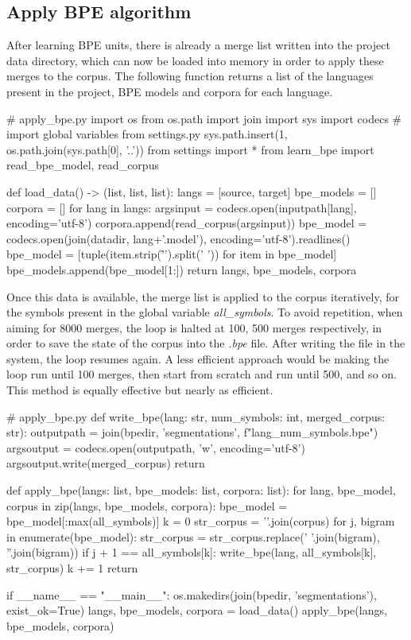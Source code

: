 \subsection{Apply BPE algorithm}\label{dev:applybpe}

After learning BPE units, there is already a merge list written into the project data directory, which can now be loaded into memory in order to apply these merges to the corpus. The following function returns a list of the languages present in the project, BPE models and corpora for each language.

\begin{python}
# apply_bpe.py
import os
from os.path import join
import sys
import codecs
# import global variables from settings.py
sys.path.insert(1, os.path.join(sys.path[0], '..'))
from settings import *
from learn_bpe import read_bpe_model, read_corpus

def load_data() -> (list, list, list):
  langs = [source, target]
  bpe_models = []
  corpora = []
  for lang in langs:
    argsinput = codecs.open(inputpath[lang], encoding='utf-8')
    corpora.append(read_corpus(argsinput))
    bpe_model = codecs.open(join(datadir, lang+'.model'), encoding='utf-8').readlines()
    bpe_model = [tuple(item.strip('\r\n ').split(' ')) for item in bpe_model]
    bpe_models.append(bpe_model[1:])
  return langs, bpe_models, corpora
\end{python}

Once this data is available, the merge list is applied to the corpus iteratively, for the symbols present in the global variable \emph{all\_symbols}. To avoid repetition, when aiming for 8000 merges, the loop is halted at 100, 500 merges respectively, in order to save the state of the corpus into the \emph{.bpe} file. After writing the file in the system, the loop resumes again. A less efficient approach would be making the loop run until 100 merges, then start from scratch and run until 500, and so on. This method is equally effective but nearly as efficient.

\begin{python}
# apply_bpe.py
def write_bpe(lang: str, num_symbols: int, merged_corpus: str):
  outputpath = join(bpedir, 'segmentations', f"{lang}_{num_symbols}.bpe")
  argsoutput = codecs.open(outputpath, 'w', encoding='utf-8')
  argsoutput.write(merged_corpus)
  return

def apply_bpe(langs: list, bpe_models: list, corpora: list):
  for lang, bpe_model, corpus in zip(langs, bpe_models, corpora):
    bpe_model = bpe_model[:max(all_symbols)]
    k = 0
    str_corpus = '\n'.join(corpus)
    for j, bigram in enumerate(bpe_model):
      str_corpus = str_corpus.replace(' '.join(bigram), ''.join(bigram))
      if j + 1 == all_symbols[k]:
        write_bpe(lang, all_symbols[k], str_corpus)
        k += 1
  return

if __name__ == "__main__":
  os.makedirs(join(bpedir, 'segmentations'), exist_ok=True)
  langs, bpe_models, corpora = load_data()
  apply_bpe(langs, bpe_models, corpora)
\end{python}

